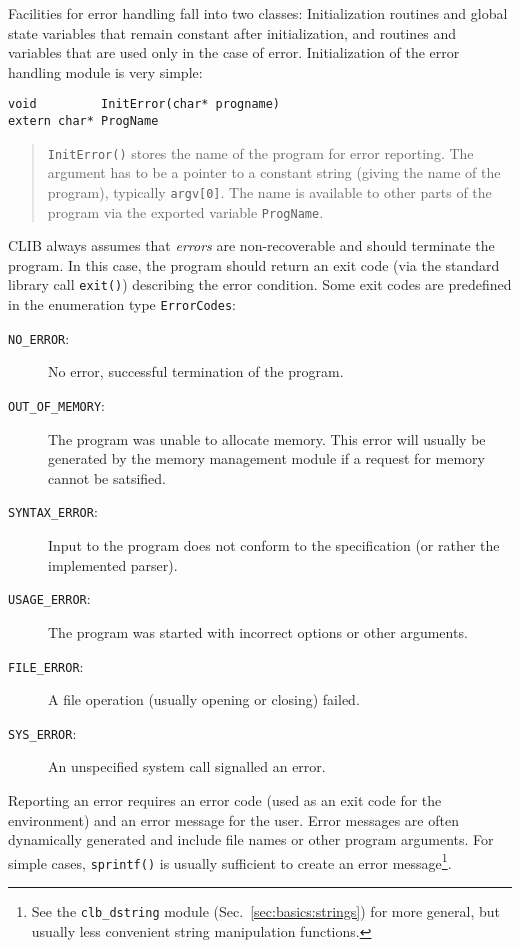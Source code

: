 Facilities for error handling fall into two classes: Initialization
routines and global state variables that remain constant after
initialization, and routines and variables that are used only in the
case of error. Initialization of the error handling module is very
simple:

\begin{verbatim}
void         InitError(char* progname)
extern char* ProgName
\end{verbatim}
\begin{quote}
  \texttt{InitError()} stores the name of the program for error
  reporting. The argument has to be a pointer to a constant string
  (giving the name of the program), typically \texttt{argv[0]}. The
  name is available to other parts of the program via the exported
  variable \texttt{ProgName}.
\end{quote}

CLIB always assumes that \emph{errors} are non-recoverable and should
terminate the program. In this case, the program should return an exit
code (via the standard library call \texttt{exit()}) describing the
error condition. Some exit codes are predefined in the enumeration
type \texttt{ErrorCodes}:

\begin{description}
\item[\texttt{NO\_ERROR}:] No error, successful termination of the
  program.
\item[\texttt{OUT\_OF\_MEMORY}:] The program was unable to allocate
  memory. This error will usually be generated by the memory
  management module if a request for memory cannot be satsified.
\item[\texttt{SYNTAX\_ERROR}:] Input to the program does not conform
  to the specification (or rather the implemented parser).
\item[\texttt{USAGE\_ERROR}:] The program was started with incorrect
  options or other arguments.
\item[\texttt{FILE\_ERROR}:] A file operation (usually opening or
  closing) failed.
\item[\texttt{SYS\_ERROR}:] An unspecified system call signalled an
  error.
\end{description}

Reporting an error requires an error code (used as an exit code for
the environment) and an error message for the user. Error messages are
often dynamically generated and include file names or other program
arguments. For simple cases, \texttt{sprintf()} is usually sufficient
to create an error message\footnote{See the \texttt{clb\_dstring}
  module (Sec.~\ref{sec:basics:strings}) for more general, but usually
  less convenient string manipulation functions.}.

